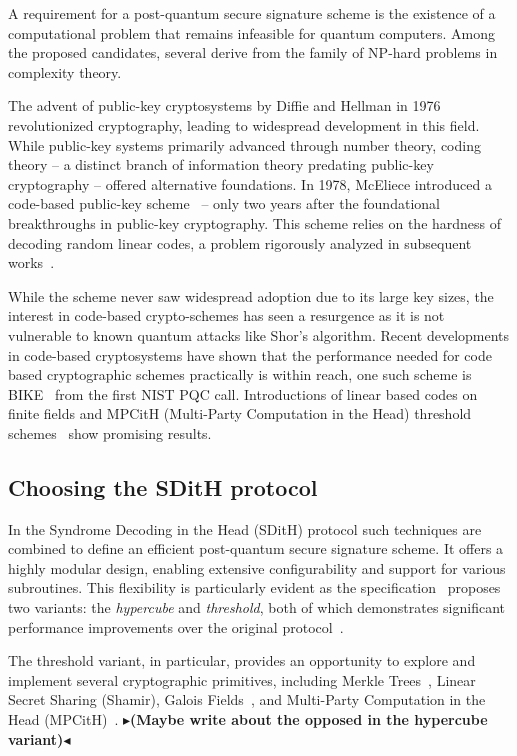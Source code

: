 \documentclass[11pt]{report}
\theoremstyle{definition}
\theoremstyle{plain}
\newcommand{\todo}[1]{{\color[rgb]{.5,0,0}\textbf{$\blacktriangleright$#1$\blacktriangleleft$}}}
\begin{document}
A requirement for a post-quantum secure signature scheme is the existence of a computational problem that remains infeasible for quantum computers. Among the proposed candidates, several derive from the family of NP-hard problems in complexity theory.

The advent of public-key cryptosystems by Diffie and Hellman in 1976 revolutionized cryptography, leading to widespread development in this field. While public-key systems primarily advanced through number theory, coding theory -- a distinct branch of information theory predating public-key cryptography -- offered alternative foundations. In 1978, McEliece introduced a code-based public-key scheme~\cite{mceliece1978public} -- only two years after the foundational breakthroughs in public-key cryptography. This scheme relies on the hardness of decoding random linear codes, a problem rigorously analyzed in subsequent works~\cite{berlekamp1978inherent}.

While the scheme never saw widespread adoption due to its large key sizes, the interest in code-based crypto-schemes has seen a resurgence as it is not vulnerable to known quantum attacks like Shor's algorithm. Recent developments in code-based cryptosystems have shown that the performance needed for code based cryptographic schemes practically is within reach, one such scheme is BIKE~\cite{BIKE_Spec_2024} from the first NIST PQC call. Introductions of linear based codes on finite fields and MPCitH (Multi-Party Computation in the Head) threshold schemes~\cite{baum2020concretely} show promising results.

\subsection{Choosing the SDitH protocol}
In the Syndrome Decoding in the Head (SDitH) protocol such techniques are combined to define an efficient post-quantum secure signature scheme. It offers a highly modular design, enabling extensive configurability and support for various subroutines. This flexibility is particularly evident as the specification~\cite{aguilarsyndrome11} proposes two variants: the \textit{hypercube} and \textit{threshold}, both of which demonstrates significant performance improvements over the original protocol~\cite{feneuil2022syndrome,aguilar2023return,feneuil2023threshold}.

The threshold variant, in particular, provides an opportunity to explore and implement several cryptographic primitives, including Merkle Trees~\cite{becker2008merkle}, Linear Secret Sharing (Shamir), Galois Fields~\cite{brownadvanced}, and Multi-Party Computation in the Head (MPCitH)~\cite{ishai2007zero,katz2018improved,baum2020concretely}. 
\todo{(Maybe write about the opposed in the hypercube variant)}
\end{document}
